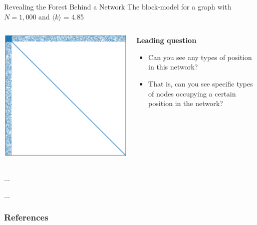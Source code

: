 \documentclass[notes, aspectratio=1610]{beamer}
\begin{document}
\begin{frame}{Revealing the Forest Behind a Network}
	{The block-model for a graph with $N = 1,000$ and $\langle k \rangle$ = 4.85 }
	\begin{columns}
		\begin{column}{0.5\textwidth}
			\centering
			\includegraphics[height=.8\textheight]{images/heatmap}
		\end{column}
		\begin{column}{0.5\textwidth}
			\textbf{Leading question}

			\begin{itemize}
				\item 
				Can you see any types of position in this network?
				\item That is, can you see specific types of nodes 
				occupying a certain position in the network?
			\end{itemize}
		\end{column}
	\end{columns}
\end{frame}


\begin{frame}{}{}
	...
\end{frame}



\begin{frame}{}{}
	...
\end{frame}

\begin{frame}
	\frametitle{References}
	\printbibliography
 \end{frame} 

\end{document}
